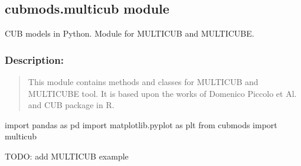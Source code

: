 \documentclass[letterpaper,10pt,english]{sphinxmanual}
\begin{document}
\begin{fulllineitems}
\label{\detokenize{cubmods:cubmods.ihg_v.probi}}
\pysigstartsignatures
{}
\pysigstopsignatures
\end{fulllineitems}



\subsection{cubmods.multicub module}
\label{\detokenize{cubmods:module-cubmods.multicub}}\label{\detokenize{cubmods:cubmods-multicub-module}}
\sphinxAtStartPar
CUB models in Python.
Module for MULTICUB and MULTICUBE.


\subsubsection{Description:}
\label{\detokenize{cubmods:id252}}\begin{quote}

\sphinxAtStartPar
This module contains methods and classes
for MULTICUB and MULTICUBE tool.
It is based upon the works of Domenico
Piccolo et Al. and CUB package in R.
\end{quote}
\begin{description}
\sphinxAtStartPar
import pandas as pd
import matplotlib.pyplot as plt
from cubmods import multicub

\sphinxAtStartPar
TODO: add MULTICUB example

\end{description}
\end{document}

